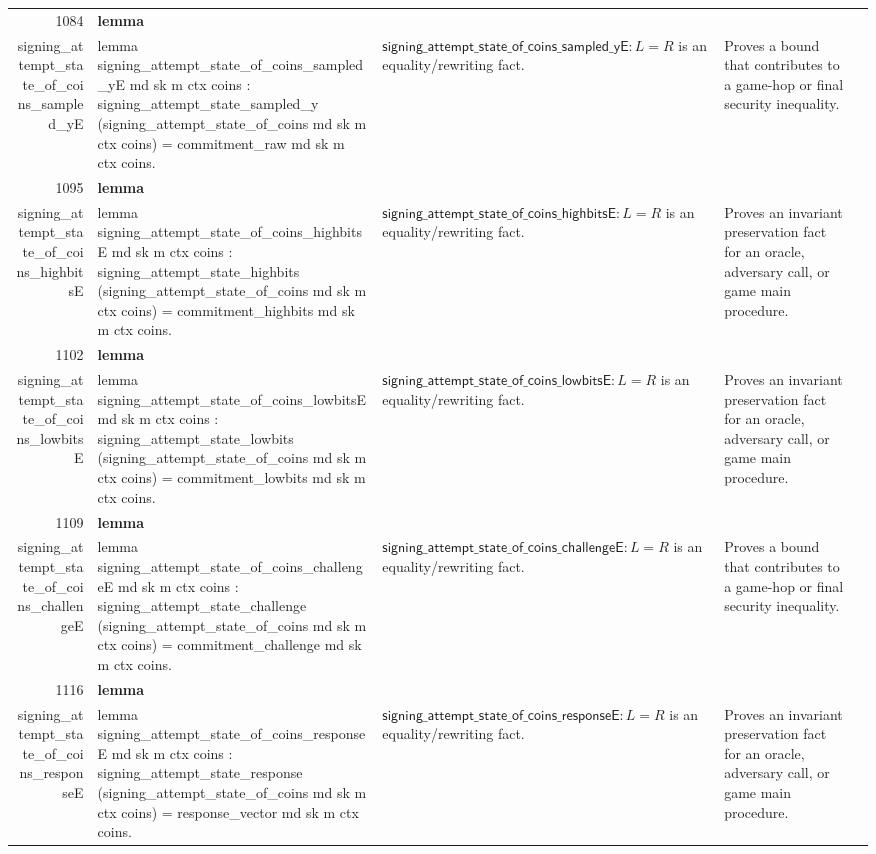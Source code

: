 \documentclass[10pt]{article}
\newcommand{\ec}[1]{\begingroup\ttfamily\scriptsize #1\endgroup}
\begin{document}
\begin{longtable}{r L{0.17\textwidth} L{0.26\textwidth} L{0.27\textwidth} L{0.20\textwidth}}
1084 & \textbf{lemma}\\\ec{signing\_attempt\_state\_of\_coins\_sampled\_yE} & \ec{lemma signing\_attempt\_state\_of\_coins\_sampled\_yE md sk m ctx coins : signing\_attempt\_state\_sampled\_y (signing\_attempt\_state\_of\_coins md sk m ctx coins) = commitment\_raw md sk m ctx coins.} & \(\mathsf{signing\_attempt\_state\_of\_coins\_sampled\_yE} : L = R\) is an equality/rewriting fact. & Proves a bound that contributes to a game-hop or final security inequality. \\
1095 & \textbf{lemma}\\\ec{signing\_attempt\_state\_of\_coins\_highbitsE} & \ec{lemma signing\_attempt\_state\_of\_coins\_highbitsE md sk m ctx coins : signing\_attempt\_state\_highbits (signing\_attempt\_state\_of\_coins md sk m ctx coins) = commitment\_highbits md sk m ctx coins.} & \(\mathsf{signing\_attempt\_state\_of\_coins\_highbitsE} : L = R\) is an equality/rewriting fact. & Proves an invariant preservation fact for an oracle, adversary call, or game main procedure. \\
1102 & \textbf{lemma}\\\ec{signing\_attempt\_state\_of\_coins\_lowbitsE} & \ec{lemma signing\_attempt\_state\_of\_coins\_lowbitsE md sk m ctx coins : signing\_attempt\_state\_lowbits (signing\_attempt\_state\_of\_coins md sk m ctx coins) = commitment\_lowbits md sk m ctx coins.} & \(\mathsf{signing\_attempt\_state\_of\_coins\_lowbitsE} : L = R\) is an equality/rewriting fact. & Proves an invariant preservation fact for an oracle, adversary call, or game main procedure. \\
1109 & \textbf{lemma}\\\ec{signing\_attempt\_state\_of\_coins\_challengeE} & \ec{lemma signing\_attempt\_state\_of\_coins\_challengeE md sk m ctx coins : signing\_attempt\_state\_challenge (signing\_attempt\_state\_of\_coins md sk m ctx coins) = commitment\_challenge md sk m ctx coins.} & \(\mathsf{signing\_attempt\_state\_of\_coins\_challengeE} : L = R\) is an equality/rewriting fact. & Proves a bound that contributes to a game-hop or final security inequality. \\
1116 & \textbf{lemma}\\\ec{signing\_attempt\_state\_of\_coins\_responseE} & \ec{lemma signing\_attempt\_state\_of\_coins\_responseE md sk m ctx coins : signing\_attempt\_state\_response (signing\_attempt\_state\_of\_coins md sk m ctx coins) = response\_vector md sk m ctx coins.} & \(\mathsf{signing\_attempt\_state\_of\_coins\_responseE} : L = R\) is an equality/rewriting fact. & Proves an invariant preservation fact for an oracle, adversary call, or game main procedure. \\

\end{longtable}
\end{document}
